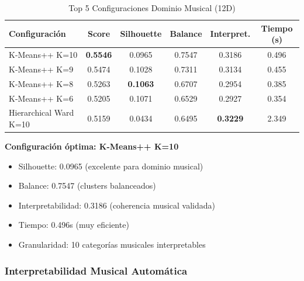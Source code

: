 \documentclass[12pt,a4paper]{report}
\begin{document}
\begin{table}[H]
\centering
\caption{Top 5 Configuraciones Dominio Musical (12D)}
\begin{tabular}{|l|c|c|c|c|c|}
\hline
\textbf{Configuración} & \textbf{Score} & \textbf{Silhouette} & \textbf{Balance} & \textbf{Interpret.} & \textbf{Tiempo (s)} \\
\hline
K-Means++ K=10 & \textbf{0.5546} & 0.0965 & 0.7547 & 0.3186 & 0.496 \\
\hline
K-Means++ K=9 & 0.5474 & 0.1028 & 0.7311 & 0.3134 & 0.455 \\
\hline
K-Means++ K=8 & 0.5263 & \textbf{0.1063} & 0.6707 & 0.2954 & 0.385 \\
\hline
K-Means++ K=6 & 0.5205 & 0.1071 & 0.6529 & 0.2927 & 0.354 \\
\hline
Hierarchical Ward K=10 & 0.5159 & 0.0434 & 0.6495 & \textbf{0.3229} & 2.349 \\
\hline
\end{tabular}
\end{table}

\textbf{Configuración óptima: K-Means++ K=10}
\begin{itemize}
    \item Silhouette: 0.0965 (excelente para dominio musical)
    \item Balance: 0.7547 (clusters balanceados)
    \item Interpretabilidad: 0.3186 (coherencia musical validada)
    \item Tiempo: 0.496s (muy eficiente)
    \item Granularidad: 10 categorías musicales interpretables
\end{itemize}

\subsubsection{Interpretabilidad Musical Automática}
\end{document}
